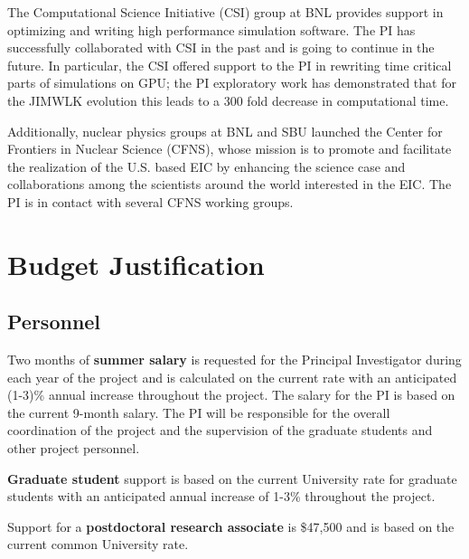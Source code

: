 \documentclass{DOEproposal}
\begin{document}
		The Computational Science Initiative (CSI) group at BNL 
		provides support in optimizing and writing high performance 
		simulation software. The PI has successfully collaborated with 
		CSI in the past and is going to continue in the future. In particular, 
		the CSI offered support to the PI in rewriting time critical 
		parts of simulations on GPU; the PI exploratory 
		work has demonstrated that for the JIMWLK evolution this leads 
		to a 300 fold decrease in computational time. 

		Additionally, nuclear physics  groups at BNL and SBU launched 
		the Center for Frontiers in Nuclear Science (CFNS), whose  mission
		is to promote and facilitate the realization of the U.S. based 
		EIC by enhancing the science case and collaborations among the 
		scientists around the world interested in the EIC. The PI is in contact
		with several CFNS working groups.  

	\newpage 
\section{Budget Justification}
        \label{sec:budget}
		\vspace{1.2em}			

		\subsection*{Personnel} 
		\vspace{0.5em}			

		\noindent
		Two months of {\bf summer salary} is requested for the Principal Investigator during each year of the project and
		is calculated on the current rate with an anticipated (1-3)\% annual increase throughout the project.  
		The salary for the PI is based on the current 9-month salary. 
		The PI will be responsible for the overall coordination of the project and the supervision of the graduate 
		students and other project personnel. 
	\vspace{0.5em}		

	\noindent
	{\bf Graduate student} support is based on the current University rate for graduate students with an anticipated 
		annual increase of 1-3\% throughout the project. 

	\vspace{0.5em}		

	\noindent
	Support for a {\bf postdoctoral research associate} is  \$47,500 and  is based on the current common University rate.
		\vspace{1.2em}			
\end{document}
